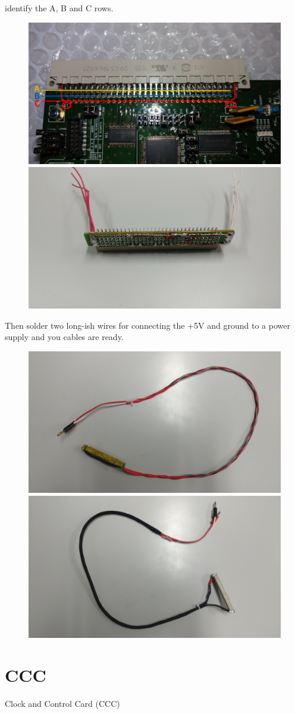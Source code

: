 \begin{enumerate}
  identify the A, B and C rows.
  \begin{figure}[H]
    \centering \includegraphics[width=0.48\linewidth,
    frame]{power-connector-connector}\hfill
    \includegraphics[width=0.48\linewidth, frame]{power-connector-connections}
  \end{figure}
  Then solder two long-ish wires for connecting the +5V and ground to a power
  supply and you cables are ready.
  \begin{figure}[H]
    \centering \includegraphics[width=0.48\linewidth,
    frame]{power-connector-cable-1}\hfill \includegraphics[width=0.48\linewidth,
    frame]{power-connector-cable-2}
  \end{figure}
\end{enumerate}


\section{CCC}
Clock and Control Card (CCC)

